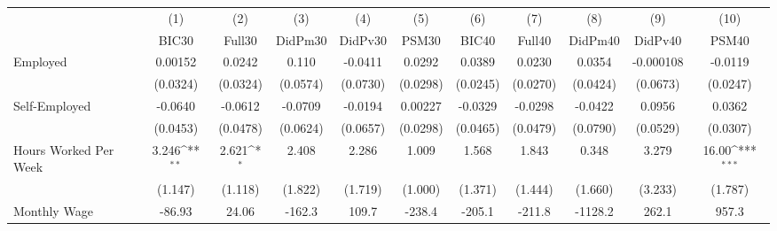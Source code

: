 {
\def\sym#1{\ifmmode^{#1}\else\(^{#1}\)\fi}
\begin{tabular}{l*{10}{c}}
\toprule
            &\multicolumn{1}{c}{(1)}&\multicolumn{1}{c}{(2)}&\multicolumn{1}{c}{(3)}&\multicolumn{1}{c}{(4)}&\multicolumn{1}{c}{(5)}&\multicolumn{1}{c}{(6)}&\multicolumn{1}{c}{(7)}&\multicolumn{1}{c}{(8)}&\multicolumn{1}{c}{(9)}&\multicolumn{1}{c}{(10)}\\
            &\multicolumn{1}{c}{BIC30}&\multicolumn{1}{c}{Full30}&\multicolumn{1}{c}{DidPm30}&\multicolumn{1}{c}{DidPv30}&\multicolumn{1}{c}{PSM30}&\multicolumn{1}{c}{BIC40}&\multicolumn{1}{c}{Full40}&\multicolumn{1}{c}{DidPm40}&\multicolumn{1}{c}{DidPv40}&\multicolumn{1}{c}{PSM40}\\
\midrule
Employed    &     0.00152         &      0.0242         &       0.110         &     -0.0411         &      0.0292         &      0.0389         &      0.0230         &      0.0354         &   -0.000108         &     -0.0119         \\
            &    (0.0324)         &    (0.0324)         &    (0.0574)         &    (0.0730)         &    (0.0298)         &    (0.0245)         &    (0.0270)         &    (0.0424)         &    (0.0673)         &    (0.0247)         \\
\addlinespace
Self-Employed&     -0.0640         &     -0.0612         &     -0.0709         &     -0.0194         &     0.00227         &     -0.0329         &     -0.0298         &     -0.0422         &      0.0956         &      0.0362         \\
            &    (0.0453)         &    (0.0478)         &    (0.0624)         &    (0.0657)         &    (0.0298)         &    (0.0465)         &    (0.0479)         &    (0.0790)         &    (0.0529)         &    (0.0307)         \\
\addlinespace
Hours Worked Per Week&       3.246\sym{**} &       2.621\sym{*}  &       2.408         &       2.286         &       1.009         &       1.568         &       1.843         &       0.348         &       3.279         &       16.00\sym{***}\\
            &     (1.147)         &     (1.118)         &     (1.822)         &     (1.719)         &     (1.000)         &     (1.371)         &     (1.444)         &     (1.660)         &     (3.233)         &     (1.787)         \\
\addlinespace
Monthly Wage&      -86.93         &       24.06         &      -162.3         &       109.7         &      -238.4         &      -205.1         &      -211.8         &     -1128.2         &       262.1         &       957.3         \\

\end{tabular}}
